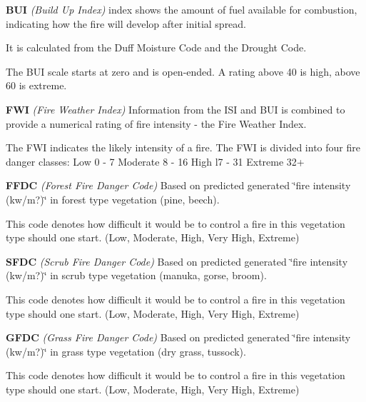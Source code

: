 {\bfseries B\-U\-I} {\itshape (Build Up Index)} index shows the amount of fuel available for combustion, indicating how the fire will develop after initial spread.\par
 It is calculated from the Duff Moisture Code and the Drought Code.\par
 The B\-U\-I scale starts at zero and is open-\/ended. A rating above 40 is high, above 60 is extreme. 

{\bfseries F\-W\-I} {\itshape (Fire Weather Index)} Information from the I\-S\-I and B\-U\-I is combined to provide a numerical rating of fire intensity -\/ the Fire Weather Index.\par
 The F\-W\-I indicates the likely intensity of a fire. The F\-W\-I is divided into four fire danger classes\-: Low 0 -\/ 7 Moderate 8 -\/ 16 High l7 -\/ 31 Extreme 32+\par
 

{\bfseries F\-F\-D\-C} {\itshape (Forest Fire Danger Code)} Based on predicted generated \char`\"{}fire intensity (kw/m?)\char`\"{} in forest type vegetation (pine, beech).\par
 This code denotes how difficult it would be to control a fire in this vegetation type should one start. (Low, Moderate, High, Very High, Extreme)\par
 

{\bfseries S\-F\-D\-C} {\itshape (Scrub Fire Danger Code)} Based on predicted generated \char`\"{}fire intensity (kw/m?)\char`\"{} in scrub type vegetation (manuka, gorse, broom).\par
 This code denotes how difficult it would be to control a fire in this vegetation type should one start. (Low, Moderate, High, Very High, Extreme)\par
 

{\bfseries G\-F\-D\-C} {\itshape (Grass Fire Danger Code)} Based on predicted generated \char`\"{}fire intensity (kw/m?)\char`\"{} in grass type vegetation (dry grass, tussock).\par
 This code denotes how difficult it would be to control a fire in this vegetation type should one start. (Low, Moderate, High, Very High, Extreme)\par
 